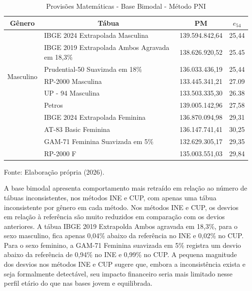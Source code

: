 \begin{table}[htbp]
    \centering
    \caption{Provisões Matemáticas - Base Bimodal - Método PNI}
    \begin{threeparttable}
    \renewcommand{\arraystretch}{1.0}
    \begin{tabular}{llrr}
    \toprule
    \multicolumn{1}{c}{\textbf{Gênero}} & \multicolumn{1}{c}{\textbf{Tábua}} & \multicolumn{1}{c}{\textbf{PM}} & \multicolumn{1}{c}{\textbf{$e_{54}$}} \\ \midrule
    \multirow{7}{*}{Masculino} & IBGE 2024 Extrapolada Masculina & 139.594.842,64 & 25,44 \\
                                & IBGE 2019 Extrapolada Ambos Agravada em 18,3\% & 138.626.920,52 & 25.45 \\
                                & Prudential-50 Suavizada em 18\% & 136.033.436,19 & 25,44 \\
                                & RP-2000 Masculina & 133.445.341,21 & 27.09 \\
                                & UP - 94 Masculina & 133.503.335,30 & 26.38 \\
                                & Petros & 139.005.142,96 & 27,58 \\ \hline
    \multirow{4}{*}{Feminino} & IBGE 2024 Extrapolada Feminina & 136.870.094,98 & 29,31	\\
                                & AT-83 Basic Feminina & 136.147.741,41 & 30,25\\
                                & GAM-71 Feminina Suavizada em 5\% & 132.629.305,17 & 29,35 \\
                                & RP-2000 F & 135.003.551,03 & 29,84 \\ \bottomrule
    \end{tabular}
    \begin{tablenotes}[flushleft]
        \small
        \item Fonte: Elaboração própria (2026).
    \end{tablenotes}
    \end{threeparttable}
    \label{tab:bimodal-pni}
\end{table}

A base bimodal apresenta comportamento mais retraído em relação ao número de tábuas inconsistentes, nos métodos INE e CUP, com apenas uma tábua inconsistente por gênero em cada método. Nos métodos INE e CUP, os desvios em relação à referência são muito reduzidos em comparação com os devios anteriores. A tábua IBGE 2019 Extrapolda Ambos agravada em 18,3\%, para o sexo masculino, fica apenas 0,04\% abaixo da referência no INE e 0,02\% no CUP. Para o sexo feminino, a GAM-71 Feminina suavizada em 5\% registra um desvio abaixo da referência de 0,94\% no INE e 0,99\% no CUP. A pequena magnitude dos desvios nos métodos INE e CUP sugere que, embora a inconsistência exista e seja formalmente detectável, seu impacto financeiro seria mais limitado nesse perfil etário do que nas bases jovem e equilibrada.

